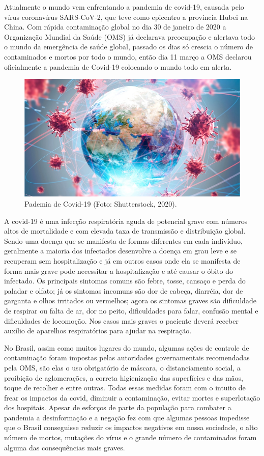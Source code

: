 \documentclass[tcc1]{uftex}
\begin{document}
	
Atualmente o mundo vem enfrentando a pandemia de covid-19, causada pelo vírus coronavírus SARS-CoV-2, que teve como epicentro a província Hubei na China. Com rápida contaminação global no dia 30 de janeiro de 2020 a Organização Mundial da Saúde (OMS) já declarava preocupação e alertava todo o mundo da emergência de saúde global, passado os dias só crescia o número de contaminados  e mortos por todo o mundo, então dia 11 março a OMS declarou oficialmente a pandemia de Covid-19 colocando o mundo todo em alerta.\cite{G1}
	
	\begin{figure}[h]

    \centering
    \includegraphics[width=12cm]{covid.jpg} %
    \caption{Pademia de Covid-19 (Foto: Shutterstock, 2020).}
    \end{figure}
	
A covid-19 é uma infecção respiratória aguda de potencial grave com números altos de mortalidade e com elevada taxa de transmissão e distribuição global. Sendo uma doença que se manifesta de formas diferentes em cada indivíduo, geralmente a maioria dos infectados desenvolve a doença em grau leve e se recuperam sem hospitalização e já em outros casos onde ela se manifesta de forma mais grave pode necessitar a hospitalização e até causar o óbito do infectado. Os principais sintomas comuns são febre, tosse, cansaço e perda do paladar e olfato; já os sintomas incomuns são dor de cabeça, diarréia, dor de garganta e olhos irritados ou vermelhos; agora os sintomas graves são dificuldade de respirar ou falta de ar, dor no peito, dificuldades para falar, confusão mental e dificuldades de locomoção.\cite{WorldHealthOrganization} Nos casos mais graves o paciente deverá receber auxílio de aparelhos respiratórios para ajudar na respiração.

No Brasil, assim como muitos lugares do mundo, algumas ações de controle de contaminação foram impostas pelas autoridades governamentais recomendadas pela OMS, são elas o uso obrigatório de máscara, o distanciamento social, a proibição de aglomerações, a correta higienização das superfícies e das mãos, toque de recolher e entre outras. Todas essas medidas foram com o intuito de frear os impactos da covid, diminuir a contaminação, evitar mortes e superlotação dos hospitais.\cite{werneck2020pandemia} Apesar de esforços de parte da população para combater a pandemia a desinformação e a negação fez com que algumas pessoas impedisse que o Brasil conseguisse reduzir os impactos negativos em nossa sociedade, o alto número de mortos, mutações do vírus e o grande número de contaminados foram alguma das consequências mais graves.
	
\end{document}

